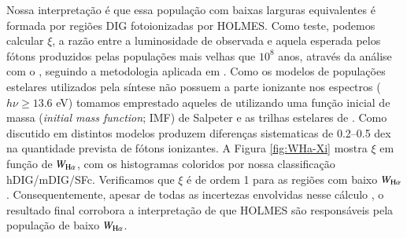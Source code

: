 Nossa interpretação é que essa população com baixas larguras equivalentes é formada por regiões DIG fotoionizadas por HOLMES. Como teste, podemos calcular $\xi$, a razão entre a luminosidade de \Ha observada e aquela esperada pelos fótons produzidos pelas populações mais velhas que $10^8$ anos, através da análise com o \starlight, seguindo a metodologia aplicada em \citet{CidFernandes.etal.2011a}. Como os modelos de populações estelares utilizados pela síntese \citep{Gonzalezdelgado2005, Vazdekis2010} não possuem a parte ionizante nos espectros ($h\nu \ge 13.6$ eV) tomamos emprestado aqueles de \citet{Bruzual.Charlot.2003} utilizando uma função inicial de massa ({\em initial mass function}; IMF) de Salpeter e as trilhas estelares de \citet{Girardi2000}. Como discutido em \citet{CidFernandes.etal.2011a} distintos modelos produzem diferenças sistematicas de 0.2--0.5 dex na quantidade  prevista de fótons ionizantes. A Figura \ref{fig:WHa-Xi} mostra $\xi$ em função de $W_{\Ha}$, com os histogramas coloridos por nossa classificação hDIG/mDIG/SFc. Verificamos que $\xi$ é de ordem 1 para as regiões com baixo $W_{\Ha}$. Consequentemente, apesar de todas as incertezas envolvidas nesse cálculo \citep{CidFernandes.etal.2011a, Belfiore.etal.2016, Morisset.etal.2016}, o resultado final corrobora a interpretação de que HOLMES são responsáveis pela população de baixo $W_{\Ha}$.


